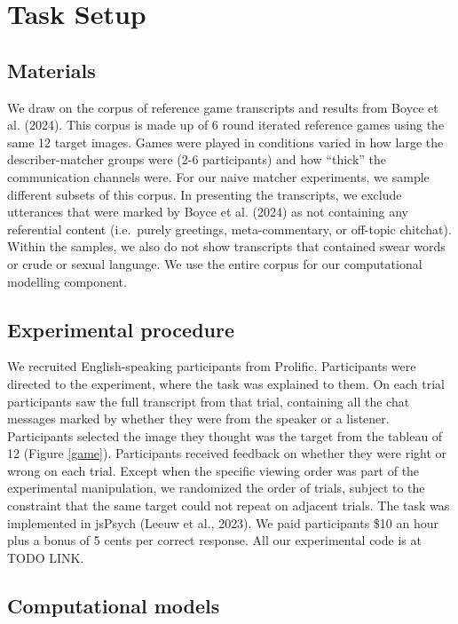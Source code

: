 \documentclass[10pt, letterpaper]{article}
\begin{document}
\section{Task Setup}\label{task-setup}

\subsection{Materials}\label{materials}

We draw on the corpus of reference game transcripts and results from
Boyce et al. (2024). This corpus is made up of 6 round iterated
reference games using the same 12 target images. Games were played in
conditions varied in how large the describer-matcher groups were (2-6
participants) and how ``thick'' the communication channels were. For our
naive matcher experiments, we sample different subsets of this corpus.
In presenting the transcripts, we exclude utterances that were marked by
Boyce et al. (2024) as not containing any referential content
(i.e.~purely greetings, meta-commentary, or off-topic chitchat). Within
the samples, we also do not show transcripts that contained swear words
or crude or sexual language. We use the entire corpus for our
computational modelling component.

\subsection{Experimental procedure}\label{experimental-procedure}

We recruited English-speaking participants from Prolific. Participants
were directed to the experiment, where the task was explained to them.
On each trial participants saw the full transcript from that trial,
containing all the chat messages marked by whether they were from the
speaker or a listener. Participants selected the image they thought was
the target from the tableau of 12 (Figure \ref{game}). Participants
received feedback on whether they were right or wrong on each trial.
Except when the specific viewing order was part of the experimental
manipulation, we randomized the order of trials, subject to the
constraint that the same target could not repeat on adjacent trials. The
task was implemented in jsPsych (Leeuw et al., 2023). We paid
participants \$10 an hour plus a bonus of 5 cents per correct response.
All our experimental code is at TODO LINK.

\subsection{Computational models}\label{computational-models}
\end{document}
